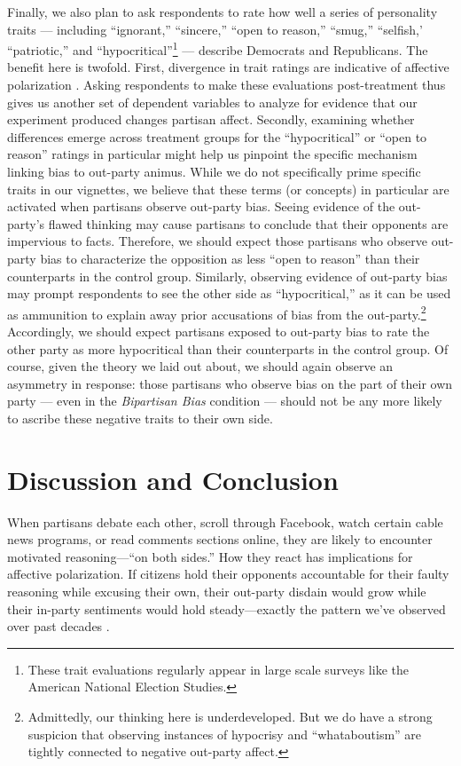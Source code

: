 \documentclass[12pt, letterpaper]{article}
\begin{document}
Finally, we also plan to ask respondents to rate how well a series of personality traits --- including ``ignorant,'' ``sincere,'' ``open to reason,'' ``smug,'' ``selfish,' ``patriotic,'' and ``hypocritical''\footnote{These trait evaluations regularly appear in large scale surveys like the American National Election Studies.} --- describe Democrats and Republicans. The benefit here is twofold. First, divergence in trait ratings are indicative of affective polarization \citep{hetheringtonlongrudolph_2016}. Asking respondents to make these evaluations post-treatment thus gives us another set of dependent variables to analyze for evidence that our experiment produced changes partisan affect. Secondly, examining whether differences emerge across treatment groups for the ``hypocritical'' or ``open to reason'' ratings in particular might help us pinpoint the specific mechanism linking bias to out-party animus. While we do not specifically prime specific traits in our vignettes, we believe that these terms (or concepts) in particular are activated when partisans observe out-party bias. Seeing evidence of the out-party's flawed thinking may cause partisans to conclude that their opponents are impervious to facts. Therefore, we should expect those partisans who observe out-party bias to characterize the opposition as less ``open to reason'' than their counterparts in the control group. Similarly, observing evidence of out-party bias may prompt respondents to see the other side as ``hypocritical,'' as it can be used as ammunition to explain away prior accusations of bias from the out-party.\footnote{Admittedly, our thinking here is underdeveloped. But we do have a strong suspicion that observing instances of hypocrisy and ``whataboutism'' are tightly connected to negative out-party affect.} Accordingly, we should expect partisans exposed to out-party bias to rate the other party as more hypocritical than their counterparts in the control group. Of course, given the theory we laid out about, we should again observe an asymmetry in response: those partisans who observe bias on the part of their own party --- even in the \textit{Bipartisan Bias} condition --- should not be any more likely to ascribe these negative traits to their own side. 

\section*{Discussion and Conclusion}

When partisans debate each other, scroll through Facebook, watch certain cable news programs, or read comments sections online, they are likely to encounter motivated reasoning---``on both sides.'' How they react has implications for affective polarization. If citizens hold their opponents accountable for their faulty reasoning while excusing their own, their out-party disdain would grow while their in-party sentiments would hold steady---exactly the pattern we've observed over past decades \citep{IyengarSoodLelkes2012}. 
\end{document}
